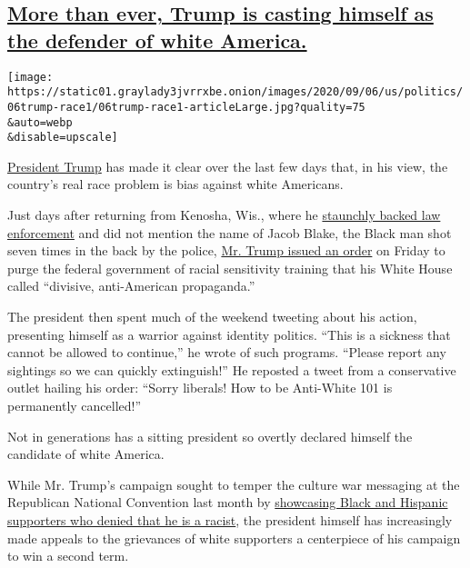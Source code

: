 \hypertarget{more-than-ever-trump-is-casting-himself-as-the-defender-of-white-america}{%
\subsection{\texorpdfstring{\protect\hyperlink{more-than-ever-trump-is-casting-himself-as-the-defender-of-white-america}{More
than ever, Trump is casting himself as the defender of white
America.}}{More than ever, Trump is casting himself as the defender of white America.}}\label{more-than-ever-trump-is-casting-himself-as-the-defender-of-white-america}}

\texttt{[image: https://static01.graylady3jvrrxbe.onion/images/2020/09/06/us/politics/06trump-race1/06trump-race1-articleLarge.jpg?quality=75\\\&auto=webp\\\&disable=upscale]}

\href{https://www.nytimes3xbfgragh.onion/interactive/2020/us/elections/donald-trump.html}{President
Trump} has made it clear over the last few days that, in his view, the
country's real race problem is bias against white Americans.

Just days after returning from Kenosha, Wis., where he
\href{https://www.nytimes3xbfgragh.onion/2020/09/01/us/politics/trump-conspiracy-theory-thugs-plane.html}{staunchly
backed law enforcement} and did not mention the name of Jacob Blake, the
Black man shot seven times in the back by the police,
\href{https://www.nytimes3xbfgragh.onion/2020/09/04/us/politics/trump-race-sensitivity-training.html}{Mr.
Trump issued an order} on Friday to purge the federal government of
racial sensitivity training that his White House called ``divisive,
anti-American propaganda.''

The president then spent much of the weekend tweeting about his action,
presenting himself as a warrior against identity politics. ``This is a
sickness that cannot be allowed to continue,'' he wrote of such
programs. ``Please report any sightings so we can quickly extinguish!''
He reposted a tweet from a conservative outlet hailing his order:
``Sorry liberals! How to be Anti-White 101 is permanently cancelled!''

Not in generations has a sitting president so overtly declared himself
the candidate of white America.

While Mr. Trump's campaign sought to temper the culture war messaging at
the Republican National Convention last month by
\href{https://www.nytimes3xbfgragh.onion/2020/08/29/us/politics/rnc-trump-race-gender.html}{showcasing
Black and Hispanic supporters who denied that he is a racist}, the
president himself has increasingly made appeals to the grievances of
white supporters a centerpiece of his campaign to win a second term.

